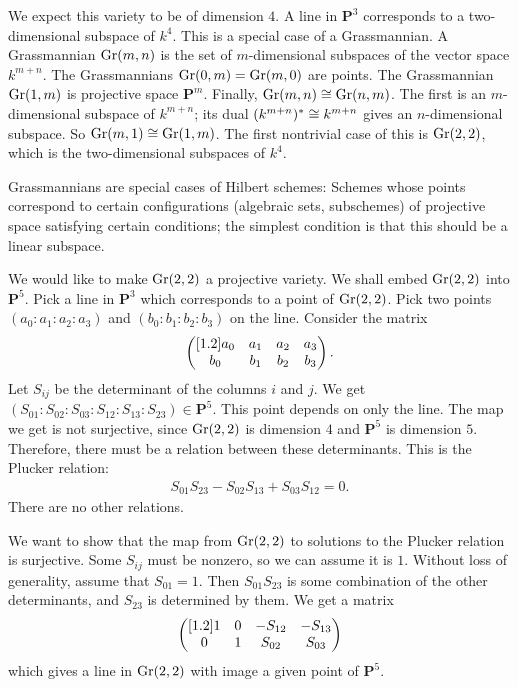\documentclass[11pt, oneside,margin=1in]{article}
\begin{document}
\begin{example}\label{}\text{}
We expect this variety to be of dimension $4$. A line in $\mathbf{P}^3$ corresponds to a two-dimensional subspace of $k^4$. This is a special case of a Grassmannian. A Grassmannian $\operatorname{Gr}(m,n)$ is the set of $m$-dimensional subspaces of the vector space $k^{m+n}$. The Grassmannians $\operatorname{Gr}(0,m)=\operatorname{Gr} (m,0)$ are points. The Grassmannian $\operatorname{Gr}(1,m)$ is projective space $\mathbf{P}^m$. Finally, $\operatorname{Gr}(m,n)\cong \operatorname{Gr} (n,m)$. The first is an $m$-dimensional subspace of $k^{m+n}$; its dual $(k^{m+n})^*\cong k^{m+n}$ gives an $n$-dimensional subspace. So $\operatorname{Gr}(m,1)\cong \operatorname{Gr}(1,m)$. The first nontrivial case of this is $\operatorname{Gr}(2,2)$, which is the two-dimensional subspaces of $k^4$.

Grassmannians are special cases of Hilbert schemes: Schemes whose points correspond to certain configurations (algebraic sets, subschemes) of projective space satisfying certain conditions; the simplest condition is that this should be a linear subspace.

We would like to make $\operatorname{Gr}(2,2)$ a projective variety. We shall embed $\operatorname{Gr}(2,2)$ into $\mathbf{P}^5$. Pick a line in $\mathbf{P}^3$ which corresponds to a point of $\operatorname{Gr}(2,2)$. Pick two points $(a_0:a_1:a_2:a_3)$ and $(b_0:b_1:b_2:b_3)$ on the line. Consider the matrix
\begin{align*}
	\begin{pmatrix} [ 1.2 ] a_0&a_1&a_2&a_3\\b_0&b_1&b_2&b_3\end{pmatrix}.
\end{align*}
Let $S_{ij}$ be the determinant of the columns $i$ and $j$. We get $(S_{01}:S_{02}:S_{03}:S_{12}:S_{13}:S_{23}) \in \mathbf{P}^5$. This point depends on only the line. The map we get is not surjective, since $\operatorname{Gr}(2,2)$ is dimension $4$ and $\mathbf{P}^5$ is dimension $5$. Therefore, there must be a relation between these determinants. This is the Plucker relation:
\begin{align*}
	S_{01}S_{23}-S_{02}S_{13}+S_{03}S_{12}=0.
\end{align*}
There are no other relations.

We want to show that the map from $\operatorname{Gr}(2,2)$ to solutions to the Plucker relation is surjective. Some $S_{ij}$ must be nonzero, so we can assume it is $1$. Without loss of generality, assume that $S_{01}=1$. Then $S_{01}S_{23}$ is some combination of the other determinants, and $S_{23}$ is determined by them. We get a matrix
\begin{align*}
	\begin{pmatrix} [ 1.2 ] 1&0&-S_{12}&-S_{13}\\0&1&S_{02}&S_{03}\end{pmatrix}
\end{align*}
which gives a line in $\operatorname{Gr}(2,2)$ with image a given point of $\mathbf{P}^5$.
\end{example}
\end{document}
